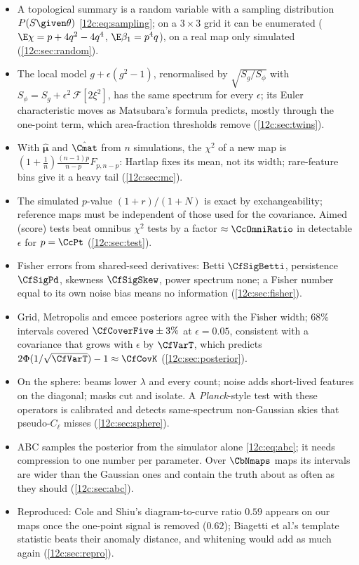 \begin{recap}
\begin{itemize}[itemsep=1pt,leftmargin=1.2em]
  \item A topological summary is a random variable with a sampling distribution $P(S\given\theta)$
        \eqref{12c:eq:sampling}; on a $3\times3$ grid it can be enumerated ($\E\chi=p+4q^2-4q^4$, $\E\beta_1=p^4q$), on a real
        map only simulated (\cref{12c:sec:random}).
  \item The local model $g+\epsilon(g^2-1)$, renormalised by $\sqrt{S_g/S_\phi}$ with $S_\phi=S_g+\epsilon^2\,\mathcal F[2\xi^2]$, has the
        same spectrum for every $\epsilon$; its Euler characteristic moves as Matsubara's formula predicts, mostly through the
        one-point term, which area-fraction thresholds remove (\cref{12c:sec:twins}).
  \item With $\hat{\bm\mu}$ and $\hat\Cmat$ from $n$ simulations, the $\chi^2$ of a new map is
        $(1+\frac1n)\frac{(n-1)p}{n-p}F_{p,n-p}$: Hartlap fixes its mean, not its width; rare-feature bins give it a heavy tail
        (\cref{12c:sec:mc}).
  \item The simulated $p$-value $(1+r)/(1+N)$ is exact by exchangeability; reference maps must be independent of those used for the
        covariance. Aimed (score) tests beat omnibus $\chi^2$ tests by a factor $\approx\CcOmniRatio$ in detectable $\epsilon$ for $p=\CcPt$
        (\cref{12c:sec:test}).
  \item Fisher errors from shared-seed derivatives: Betti $\CfSigBetti$, persistence $\CfSigPd$, skewness $\CfSigSkew$, power spectrum none;
        a Fisher number equal to its own noise bias means no information (\cref{12c:sec:fisher}).
  \item Grid, Metropolis and emcee posteriors agree with the Fisher width; $68\%$ intervals covered $\CfCoverFive\pm3\%$ at $\epsilon=0.05$,
        consistent with a covariance that grows with $\epsilon$ by $\CfVarT$, which predicts $2\Phi(1/\sqrt{\CfVarT})-1\approx\CfCovK$
        (\cref{12c:sec:posterior}).
  \item On the sphere: beams lower $\lambda$ and every count; noise adds short-lived features on the diagonal; masks cut and isolate.
        A \textit{Planck}-style test with these operators is calibrated and detects same-spectrum non-Gaussian skies that pseudo-$C_\ell$
        misses (\cref{12c:sec:sphere}).
  \item ABC samples the posterior from the simulator alone \eqref{12c:eq:abc}; it needs compression to one number per parameter. Over
        $\CbNmaps$ maps its intervals are wider than the Gaussian ones and contain the truth about as often as they should
        (\cref{12c:sec:abc}).
  \item Reproduced: Cole and Shiu's diagram-to-curve ratio $0.59$ appears on our maps once the one-point signal is removed ($0.62$);
        Biagetti et al.'s template statistic beats their anomaly distance, and whitening would add as much again
        (\cref{12c:sec:repro}).
\end{itemize}
\end{recap}

